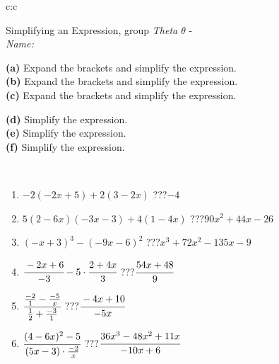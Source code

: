 \documentclass[10pt]{report}
\begin{document}
\newpage
\thispagestyle{empty}
\begin{tabular}{c:c}
\begin{minipage}[c][104.5mm][t]{0.5\linewidth}
\begin{center}
\vspace{7mm}
{\huge Simplifying an Expression, group \textit{Theta $\theta$} -}\\[5mm]
\textit{Name:}\phantom{xxxxxxxxxxxxxxxxxxxxxxxxxxxxxxxxxxxxxxxxxxxxxxxxxxxxxxxxxxxxxxxxx}\\[5mm]
\begin{minipage}{0.95\linewidth}
\begin{center}
{\small \begin{minipage}{0.6\textwidth}
\textbf{(a)} Expand the brackets and simplify the expression. \\[1mm]
\textbf{(b)} Expand the brackets and simplify the expression. \\[1mm]
\textbf{(c)} Expand the brackets and simplify the expression.
\end{minipage} \begin{minipage}{0.39\textwidth}
\textbf{(d)} Simplify the expression. \\[1mm]
\textbf{(e)} Simplify the expression. \\[1mm]
\textbf{(f)} Simplify the expression.
\end{minipage}
}
\end{center}
\end{minipage}
\\[4mm]
\begin{minipage}{0.79\linewidth}
\begin{center}
\begin{varwidth}{\linewidth}
\begin{enumerate}
\normalsize
\item $-2(-2x+5)+2(3-2x)$\quad \dotfill\; ???\;\dotfill \quad $-4$
\item $5(2-6x)(-3x-3)+4(1-4x)$\quad \dotfill\; ???\;\dotfill \quad $90x^2+44x-26$
\item $(-x+3)^3-(-9x-6)^2$\quad \dotfill\; ???\;\dotfill \quad $x^3+72x^2-135x-9$
\item $\cfrac{-2x+6}{-3}-5\cdot\cfrac{2+4x}{3}$\quad \dotfill\; ???\;\dotfill \quad $\cfrac{54x+48}{9}$
\item $\cfrac{\frac{-2}{1}-\frac{-5}{x}}{\frac{1}{2}+\frac{-3}{1}}$\quad \dotfill\; ???\;\dotfill \quad $\cfrac{-4x+10}{-5x}$
\item $\cfrac{(4-6x)^2-5}{(5x-3)\cdot\frac{-2}{x}}$\quad \dotfill\; ???\;\dotfill \quad $\cfrac{36x^3-48x^2+11x}{-10x+6}$

\end{enumerate}
\end{varwidth}
\end{center}
\end{minipage}
\end{center}
\end{minipage}
\end{tabular}
\end{document}
